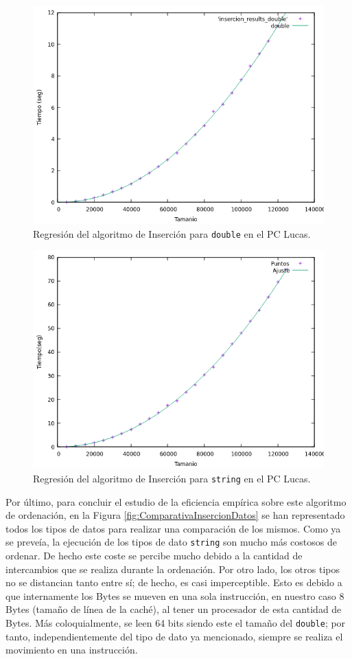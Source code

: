 \documentclass[12pt]{article}
\begin{document}
    \begin{figure}
        \centering
        \includegraphics[width=0.8\linewidth]{images/Insercion/Ajuste double.png}
        \cprotect\caption{Regresión del algoritmo de Inserción para \verb|double| en el PC Lucas.}
        \label{fig:RegresionInsercionDouble}
    \end{figure}

    \begin{figure}
        \centering
        \includegraphics[width=0.8\linewidth]{images/Insercion/insercion_string_graf.png}
        \cprotect\caption{Regresión del algoritmo de Inserción para \verb|string| en el PC Lucas.}
        \label{fig:RegresionInsercionString}
    \end{figure}


    Por último, para concluir el estudio de la eficiencia empírica sobre este algoritmo de ordenación, en la Figura \ref{fig:ComparativaInsercionDatos} se han representado todos los tipos de datos para realizar una comparación de los mismos. Como ya se preveía, la ejecución de los tipos de dato \verb|string| son mucho más costosos de ordenar. De hecho este coste se percibe mucho debido a la cantidad de intercambios que se realiza durante la ordenación.  Por otro lado, los otros tipos no se distancian tanto entre sí; de hecho, es casi imperceptible. Esto es debido a que internamente los Bytes se mueven en una sola instrucción, en nuestro caso 8 Bytes (tamaño de línea de la caché), al tener un procesador de esta cantidad de Bytes. Más coloquialmente, se leen 64 bits siendo este el tamaño del \verb|double|; por tanto, independientemente del tipo de dato ya mencionado, siempre se realiza el movimiento en una instrucción.
    
\end{document}
